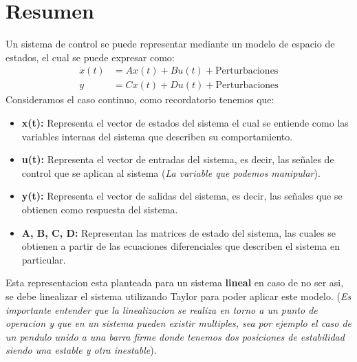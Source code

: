 \documentclass[
  11pt,
  letterpaper,
   addpoints,
   answers
  ]{exam}
\begin{document}
\section{Resumen}
Un sistema de control se puede representar mediante un modelo de espacio de estados, el cual se puede expresar como:
\begin{align}
    \dot{x}(t) &= Ax(t) + Bu(t) + \text{Perturbaciones} \\
    y &= Cx(t) + Du(t) + \text{Perturbaciones}
\end{align}
Consideramos el caso continuo, como recordatorio tenemos que:
\begin{itemize}
    \item \textbf{x(t):} Representa el vector de estados del sistema el cual se entiende como las variables internas del sistema que describen su comportamiento.
    \item \textbf{u(t):} Representa el vector de entradas del sistema, es decir, las señales de control que se aplican al sistema (\textit{La variable que podemos manipular}).
    \item \textbf{y(t):} Representa el vector de salidas del sistema, es decir, las señales que se obtienen como respuesta del sistema.
    \item \textbf{A, B, C, D:} Representan las matrices de estado del sistema, las cuales se obtienen a partir de las ecuaciones diferenciales que describen el sistema en particular.
\end{itemize}
Esta representacion esta planteada para un sistema \textbf{lineal} en caso de no ser asi, se debe linealizar el sistema utilizando Taylor para poder aplicar este modelo. (\textit{Es importante entender que la linealizacion se realiza en torno a un punto de operacion y que en un sistema pueden existir multiples, sea por ejemplo el caso de un pendulo unido a una barra firme donde tenemos dos posiciones de estabilidad siendo una estable y otra inestable}).
\end{document}
